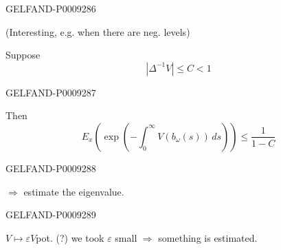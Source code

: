 \begin{GelfandAdjacentEvidence}{GELFAND-P000928}{6}


(Interesting, e.g. when there are neg. levels)

Suppose
\begin{equation*}
 \left|\Delta^{-1}V\right|\le C<1
 \tag{13}
\end{equation*}
\end{GelfandAdjacentEvidence}
\begin{GelfandAdjacentEvidence}{GELFAND-P000928}{7}


Then
\begin{equation*}
 E_x\left(\exp\left(-\int_0^\infty V(b_\omega(s))\,ds\right)\right)
 \le\frac{1}{1-C}
 \tag{14}
\end{equation*}
\end{GelfandAdjacentEvidence}
\begin{GelfandAdjacentEvidence}{GELFAND-P000928}{8}


$\Rightarrow$ estimate the eigenvalue.
\end{GelfandAdjacentEvidence}
\begin{GelfandAdjacentEvidence}{GELFAND-P000928}{9}


$V\longmapsto\varepsilon V$\quad pot. (?) we took $\varepsilon$ small $\Rightarrow$ something is estimated.
\end{GelfandAdjacentEvidence}



